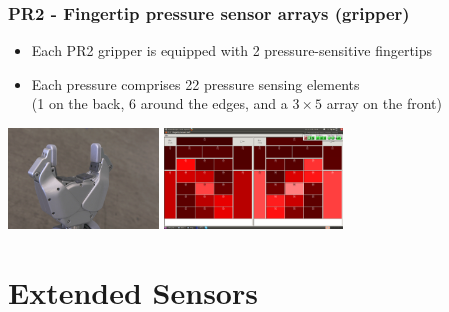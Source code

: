\begin{frame}
  \frametitle{PR2 - Fingertip pressure sensor arrays (gripper)}
\begin{itemize}
    \item Each PR2 gripper is equipped with 2 pressure-sensitive fingertips
    \item Each pressure comprises 22 pressure sensing elements \\(1 on the back, 6 around the edges, and a $3 \times 5$ array on the front)
\end{itemize}
\vspace{2ex}\hspace{6ex}
\includegraphics[width=4cm]{../images/IMG_1208.JPG} \hspace{1ex}
\includegraphics[width=4.75cm]{../images/fingertip_pressure3.png}  
\end{frame}



\section{Extended Sensors}

